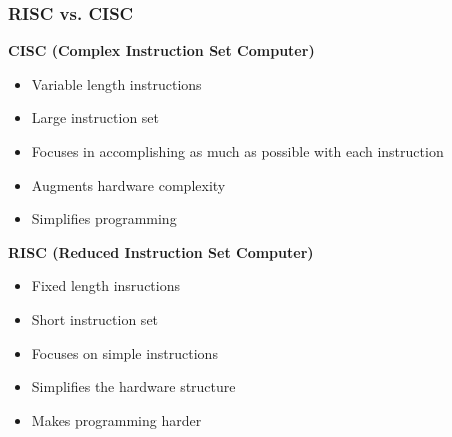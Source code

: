 \subsubsection{\acs{RISC} vs. \acs{CISC}}
\begin{multicols}{2}
	\textbf{\acs{CISC} (Complex Instruction Set Computer)}
		\begin{itemize}
			\item Variable length instructions
			\item Large instruction set
			\item Focuses in accomplishing as much as possible with each instruction
			\item Augments hardware complexity
			\item Simplifies programming
		\end{itemize} 
          \columnbreak
	\textbf{\acs{RISC} (Reduced Instruction Set Computer)}
		\begin{itemize}
			\item Fixed length insructions
			\item Short instruction set
			\item Focuses on simple instructions
			\item Simplifies the hardware structure
			\item Makes programming harder
		\end{itemize}      
\end{multicols}

